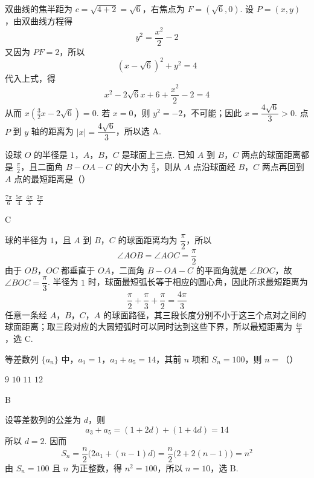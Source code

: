 \begin{solution}
双曲线的焦半距为 \(c=\sqrt{4+2}=\sqrt6\)，右焦点为 \(F=(\sqrt6,0)\). 设 \(P=(x,y)\)，由双曲线方程得
\[
y^{2}=\frac{x^{2}}{2}-2
\]
又因为 \(PF=2\)，所以
\[
(x-\sqrt6)^{2}+y^{2}=4
\]
代入上式，得
\[
x^{2}-2\sqrt6x+6+\frac{x^{2}}2-2=4
\]
从而 \(x\left(\frac32x-2\sqrt6\right)=0\).
若 \(x=0\)，则 \(y^{2}=-2\)，不可能；因此 \(x=\dfrac{4\sqrt6}{3}>0\). 点 \(P\) 到 \(y\) 轴的距离为 \(|x|=\dfrac{4\sqrt6}{3}\)，所以选 A.
\end{solution}

\begin{problem}
设球 \(O\) 的半径是 \(1\)，\(A\)，\(B\)，\(C\) 是球面上三点. 已知 \(A\) 到 \(B\)，\(C\) 两点的球面距离都是 \(\frac{\pi}{2}\)，且二面角 \(B - OA - C\) 的大小为 \(\frac{\pi}{3}\)，则从 \(A\) 点沿球面经 \(B\)，\(C\) 两点再回到 \(A\) 点的最短距离是（\quad）


\choices
    {\(\frac{7\pi}{6}\)}
    {\(\frac{5\pi}{4}\)}
    {\(\frac{4\pi}{3}\)}
    {\(\frac{3\pi}{2}\)}
\end{problem}

\begin{answer}
C
\end{answer}

\begin{solution}
球的半径为 \(1\)，且 \(A\) 到 \(B\)，\(C\) 的球面距离均为 \(\dfrac\pi2\)，所以
\[
\angle AOB=\angle AOC=\frac\pi2
\]
由于 \(OB\)，\(OC\) 都垂直于 \(OA\)，二面角 \(B-OA-C\) 的平面角就是 \(\angle BOC\)，故 \(\angle BOC=\dfrac\pi3\). 半径为 \(1\) 时，球面最短弧长等于相应的圆心角，因此所求最短距离为
\[
\frac\pi2+\frac\pi3+\frac\pi2=\frac{4\pi}{3}
\]
任意一条经 \(A\)，\(B\)，\(C\)，\(A\) 的球面路径，其三段长度分别不小于这三个点对之间的球面距离；取三段对应的大圆短弧时可以同时达到这些下界，所以最短距离为 \(\frac{4\pi}{3}\)，选 C.
\end{solution}

\begin{problem}
等差数列 \(\{a_{n}\}\) 中，\(a_{1} = 1\)，\(a_{3} + a_{5} = 14\)，其前 \(n\) 项和 \(S_{n} = 100\)，则 \(n =\)（\quad）

\choices
    {\(9\)}
    {\(10\)}
    {\(11\)}
    {\(12\)}
\end{problem}

\begin{answer}
B
\end{answer}

\begin{solution}
设等差数列的公差为 \(d\)，则
\[
a_{3}+a_{5}=(1+2d)+(1+4d)=14
\]
所以 \(d=2\). 因而
\[
S_{n}=\frac{n}{2}\bigl(2a_{1}+(n-1)d\bigr)
 =\frac{n}{2}\bigl(2+2(n-1)\bigr)=n^{2}
\]
由 \(S_{n}=100\) 且 \(n\) 为正整数，得 \(n^{2}=100\)，所以 \(n=10\)，选 B.
\end{solution}

